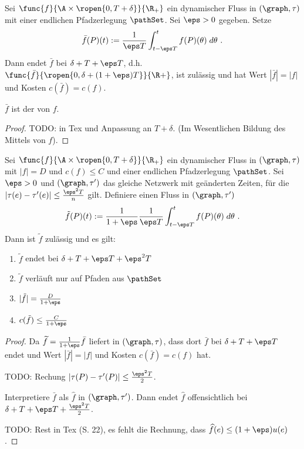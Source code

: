\begin{lemma}\label{lem:flow_avg}
    Sei $\func{f}{\A \times \ropen{0, T + \delta}}{\R_+}$ ein dynamischer Fluss in
    $(\graph, \tau)$ mit einer endlichen Pfadzerlegung $\pathSet$.
    Sei $\eps > 0$ gegeben. Setze
    \[
    \bar{f}(P)(t) := \frac{1}{\eps T}
                            \int_{t - \eps T}^{t} f(P)(\theta) \; d\theta \text{ .}
    \]
    Dann endet $\bar{f}$ bei $\delta + T + \eps T$,
    d.h. $\func{\bar{f}}{\ropen{0, \delta + (1+\eps)T}}{\R+}$, ist zulässig und hat Wert
    $|\bar{f}| = |f|$ und Kosten $c(\bar{f}) = c(f)$.

    $\bar{f}$ ist der  von $f$.

    \begin{proof}
        TODO: in Tex und Anpassung an $T + \delta$.
        (Im Wesentlichen Bildung des Mittels von $f$).
    \end{proof}
\end{lemma}

\begin{theorem}\label{theo:slow_flow}
    Sei $\func{f}{\A \times \ropen{0, T + \delta}}{\R_+}$ ein dynamischer Fluss in
    $(\graph, \tau)$ mit $|f| = D$ und $c(f) \leq C$ und einer endlichen
    Pfadzerlegung $\pathSet$. Sei $\eps > 0$ und $(\graph, \tau')$ das
    gleiche Netzwerk mit geänderten Zeiten, für die
    $\left|\tau(e) - \tau'(e)\right| \leq \frac{\eps^2T}{n}$ gilt. Definiere
    einen Fluss in $(\graph, \tau')$
    \[
    \tilde{f}(P)(t) := \frac{1}{1+\eps} \frac{1}{\eps T}
                            \int_{t - \eps T}^{t} f(P)(\theta) \; d\theta \text{ .}
    \]
    Dann ist $\tilde{f}$ zulässig und es gilt:
    \begin{enumerate}
        \item $\tilde{f}$ endet bei $\delta + T + \eps T + \eps^2 T$
        \item $\tilde{f}$ verläuft nur auf Pfaden aus $\pathSet$
        \item $|\tilde{f}| = \frac{D}{1 + \eps}$
        \item $c(\tilde{f}) \leq \frac{C}{1 + \eps}$
    \end{enumerate}
    
    \begin{proof}
        Da $\widetilde{f} = \frac{1}{1 + \eps} \bar{f}$ liefert 
        in $(\graph, \tau)$, dass dort $\bar{f}$ bei $\delta + T + \eps T$ endet
        und Wert $|\bar{f}| = |f|$ und Kosten $c(\bar{f}) = c(f)$ hat.

        TODO: Rechung $|\tau(P) - \tau'(P)| \leq \frac{\eps^2T}{2}$.

        Interpretiere $\bar{f}$ als $\widehat{f}$ in $(\graph, \tau')$. Dann endet
        $\widehat{f}$ offensichtlich bei $\delta + T + \eps T + \frac{\eps^2T}{2}$.

        TODO: Rest in Tex (S. 22), es fehlt die Rechnung, dass
            $\widehat{f}(e) \leq (1+\eps)u(e)$.
    \end{proof}
\end{theorem}

